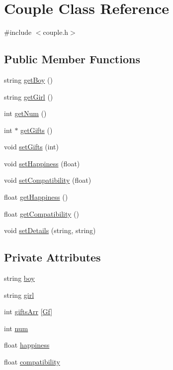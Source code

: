 \hypertarget{classCouple}{}\section{Couple Class Reference}
\label{classCouple}


{\ttfamily \#include $<$couple.\+h$>$}

\subsection*{Public Member Functions}
\begin{DoxyCompactItemize}
\item 
string \hyperlink{classCouple_a092cbc580ea255febc3eb211c5f56512}{get\+Boy} ()
\item 
string \hyperlink{classCouple_a653983df7e331c0534ae2ce42e9856c5}{get\+Girl} ()
\item 
int \hyperlink{classCouple_a05a3bbd0d8d6b149ae04f5306acd4439}{get\+Num} ()
\item 
int $\ast$ \hyperlink{classCouple_a80cef2647acb3903936372a0d70cf9cc}{get\+Gifts} ()
\item 
void \hyperlink{classCouple_a1a621700c479fd808b0caf034f4bd0f5}{set\+Gifts} (int)
\item 
void \hyperlink{classCouple_a19afd8575f26caa557115a106b6a4928}{set\+Happiness} (float)
\item 
void \hyperlink{classCouple_a4fe1bbdbf59458c1a903569b6f2edca3}{set\+Compatibility} (float)
\item 
float \hyperlink{classCouple_a9562bd3f5ace166db48803e2a564b325}{get\+Happiness} ()
\item 
float \hyperlink{classCouple_aab84b87970e19e90cec4a07782ad5380}{get\+Compatibility} ()
\item 
void \hyperlink{classCouple_a0057d3dfd3939a156cd99f6c5cf32279}{set\+Details} (string, string)
\end{DoxyCompactItemize}
\subsection*{Private Attributes}
\begin{DoxyCompactItemize}
\item 
string \hyperlink{classCouple_a09287e695df4efe77ee1f331cf52627f}{boy}
\item 
string \hyperlink{classCouple_a262cd799c80ed8da1a2a17064a01c698}{girl}
\item 
int \hyperlink{classCouple_a153dcb0b7c2cc4740b2baaad16432aee}{gifts\+Arr} \mbox{[}\hyperlink{Ques2_8cpp_a5e0c07e523d4e77a2cafca06feb836f6}{Gf}\mbox{]}
\item 
int \hyperlink{classCouple_aa3ac9c1d11ce38a5fb4db176f6e9565c}{num}
\item 
float \hyperlink{classCouple_a4a874566f44bc9279c650b975799553a}{happiness}
\item 
float \hyperlink{classCouple_ac7543a88edc2bb75d1b599b47c6fc4fb}{compatibility}
\end{DoxyCompactItemize}


